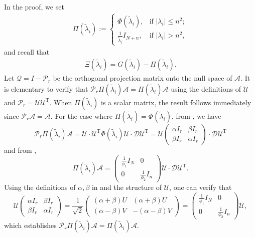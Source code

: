 \documentclass[reqno]{amsart}
\newcommand{\T}{\mathrm{T}}
\theoremstyle{plain}
\theoremstyle{definition}
\begin{document}
In the proof, we set
\begin{align}\label{eq:Pi-new}
\Pi(\widetilde \lambda_i):=\begin{cases}
\Phi(\widetilde \lambda_i), &\text{if } |\lambda_i|\le n^2; \\
\frac{1}{\widetilde \lambda_i} I_{N+n}, &\text{if } |\lambda_i| > n^2,
\end{cases}
\end{align} 
and recall that
\begin{align*}%
\Xi(\widetilde \lambda_i)=G(\widetilde \lambda_i)-\Pi(\widetilde \lambda_i).
\end{align*}
Let $\mathcal Q=I-\mathcal P_r$ be the orthogonal projection matrix onto the null space of $\mathcal A$. It is elementary to verify that $\mathcal P_r \Pi(\widetilde \lambda_i) \mathcal A = \Pi(\widetilde \lambda_i) \mathcal A$ using the definitions of $\mathcal U$ and $\mathcal P_r = \mathcal U \mathcal U^\T$.  When  $\Pi(\widetilde \lambda_i )$ is a scalar matrix, the result follows immediately since $\mathcal P_r\mathcal A= \mathcal A.$ For the case where $\Pi(\widetilde \lambda_i) = \Phi(\widetilde \lambda_i)$, from \cite[Eq. (29)]{Wang24}, we have
\[\mathcal P_r \Pi(\widetilde \lambda_i) \mathcal A = \mathcal U \cdot \mathcal U^\T \Phi(\widetilde \lambda_i)\mathcal U \cdot \mathcal D \mathcal U^\T=\mathcal U \begin{pmatrix} \alpha I_r & \beta I_r \\ \beta I_r & \alpha I_r\end{pmatrix} \cdot \mathcal D \mathcal U^\T\]
and from \cite[Eq. (25)]{Wang24}, \[ \Pi(\widetilde \lambda_i) \mathcal A = \begin{pmatrix}
\frac{1}{\phi_1}I_N & 0 \\
0 &\frac{1}{\phi_2}I_n
\end{pmatrix} \mathcal U \cdot \mathcal D \mathcal U^\T.\]
Using the definitions of $\alpha,\beta$ in \cite[Eq. (29)]{Wang24} and the structure of $\mathcal U$, one can verify that \[ \mathcal U \begin{pmatrix} \alpha I_r & \beta I_r \\ \beta I_r & \alpha I_r\end{pmatrix} = \frac{1}{\sqrt 2} \begin{pmatrix} (\alpha+\beta)U & (\alpha+\beta)U\\ (\alpha-\beta)V  & -(\alpha-\beta)V\end{pmatrix} = \begin{pmatrix}
\frac{1}{\phi_1}I_N & 0 \\
0 &\frac{1}{\phi_2}I_n
\end{pmatrix} \mathcal U, \]
which establishes $\mathcal P_r \Pi(\widetilde \lambda_i) \mathcal A = \Pi(\widetilde \lambda_i) \mathcal A$. 
\end{document}
